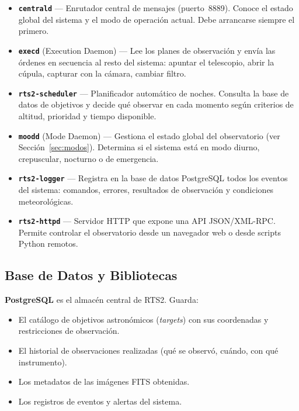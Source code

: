 \documentclass[12pt,a4paper,titlepage]{article}
\begin{document}
\begin{itemize}
  \item \textbf{\texttt{centrald}} --- Enrutador central de mensajes (puerto~8889). Conoce el estado global del sistema y el modo de operación actual. Debe arrancarse siempre el primero.

  \item \textbf{\texttt{execd}} (Execution Daemon) --- Lee los planes de observación y envía las órdenes en secuencia al resto del sistema: apuntar el telescopio, abrir la cúpula, capturar con la cámara, cambiar filtro.

  \item \textbf{\texttt{rts2-scheduler}} --- Planificador automático de noches. Consulta la base de datos de objetivos y decide qué observar en cada momento según criterios de altitud, prioridad y tiempo disponible.

  \item \textbf{\texttt{moodd}} (Mode Daemon) --- Gestiona el estado global del observatorio (ver Sección~\ref{sec:modos}). Determina si el sistema está en modo diurno, crepuscular, nocturno o de emergencia.

  \item \textbf{\texttt{rts2-logger}} --- Registra en la base de datos PostgreSQL todos los eventos del sistema: comandos, errores, resultados de observación y condiciones meteorológicas.

  \item \textbf{\texttt{rts2-httpd}} --- Servidor HTTP que expone una API JSON/XML-RPC. Permite controlar el observatorio desde un navegador web o desde scripts Python remotos.
\end{itemize}

\subsection{Base de Datos y Bibliotecas}

\textbf{PostgreSQL} es el almacén central de RTS2. Guarda:
\begin{itemize}
  \item El catálogo de objetivos astronómicos (\textit{targets}) con sus coordenadas y restricciones de observación.
  \item El historial de observaciones realizadas (qué se observó, cuándo, con qué instrumento).
  \item Los metadatos de las imágenes FITS obtenidas.
  \item Los registros de eventos y alertas del sistema.
\end{itemize}
\end{document}

